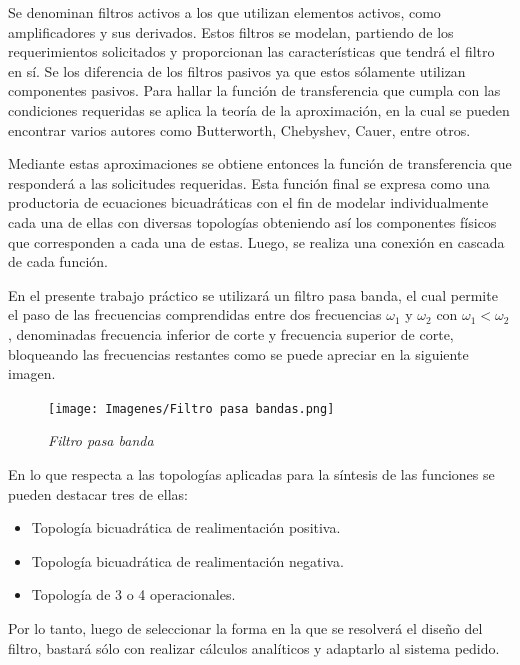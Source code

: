 \documentclass[12pt,A4paper,titlepage]{article}
\begin{document}
\bigskip
\hspace{1mm} Se denominan filtros activos a los que utilizan elementos activos, como amplificadores y sus derivados. Estos filtros se modelan, partiendo de los requerimientos solicitados y proporcionan las características que tendrá el filtro en sí. Se los diferencia de los filtros pasivos ya que estos sólamente utilizan componentes pasivos. Para hallar la función de transferencia que cumpla con las condiciones requeridas se aplica la teoría de la aproximación, en la cual se pueden encontrar varios autores como Butterworth, Chebyshev, Cauer, entre otros.

\bigskip
\hspace{1mm} Mediante estas aproximaciones se obtiene entonces la función de transferencia que responderá a las solicitudes requeridas. Esta función final se expresa como una productoria de ecuaciones bicuadráticas con el fin de modelar individualmente cada una de ellas con diversas topologías obteniendo así los componentes físicos que corresponden a cada una de estas. Luego, se realiza una conexión en cascada de cada función. 

\bigskip
\hspace{1mm} En el presente trabajo práctico se utilizará un filtro pasa banda, el cual permite el paso de las frecuencias comprendidas entre dos frecuencias \(\omega_1 \) y \(\omega_2 \) con \(\omega_1 < \omega_2 \), denominadas frecuencia inferior de corte y frecuencia superior de corte, bloqueando las frecuencias restantes como se puede apreciar en la siguiente imagen. 

\begin{figure}[!h] 
  \centering
  \texttt{[image: Imagenes/Filtro pasa bandas.png]}
  \caption{\textit{Filtro pasa banda}}
\end{figure}

\hspace{1mm} En lo que respecta a las topologías aplicadas para la síntesis de las funciones se pueden destacar tres de ellas:

\begin{itemize}[itemsep=1pt]
    \item Topología bicuadrática de realimentación positiva.
    \item Topología bicuadrática de realimentación negativa.
    \item Topología de 3 o 4 operacionales. 
\end{itemize}

\hspace{1mm} Por lo tanto, luego de seleccionar la forma en la que se resolverá el diseño del filtro, bastará sólo con realizar cálculos analíticos y adaptarlo al sistema pedido.
\end{document}
